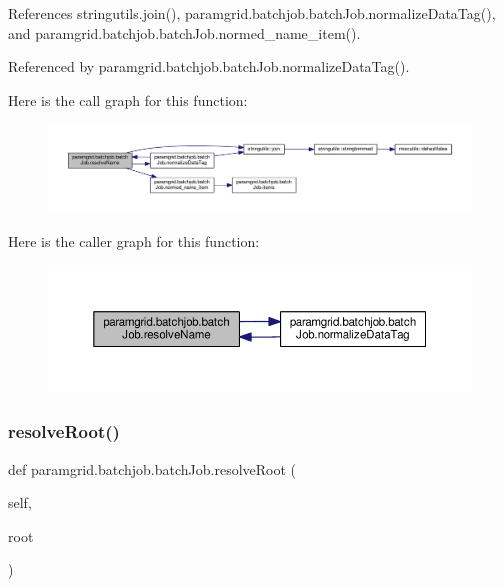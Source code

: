 References stringutils.\+join(), paramgrid.\+batchjob.\+batch\+Job.\+normalize\+Data\+Tag(), and paramgrid.\+batchjob.\+batch\+Job.\+normed\+\_\+name\+\_\+item().



Referenced by paramgrid.\+batchjob.\+batch\+Job.\+normalize\+Data\+Tag().

Here is the call graph for this function\+:
\nopagebreak
\begin{figure}[H]
\begin{center}
\leavevmode
\includegraphics[width=350pt]{classparamgrid_1_1batchjob_1_1batchJob_ac178cba753c0e34bf0402ed35db56f51_cgraph}
\end{center}
\end{figure}
Here is the caller graph for this function\+:
\nopagebreak
\begin{figure}[H]
\begin{center}
\leavevmode
\includegraphics[width=350pt]{classparamgrid_1_1batchjob_1_1batchJob_ac178cba753c0e34bf0402ed35db56f51_icgraph}
\end{center}
\end{figure}
\mbox{\label{classparamgrid_1_1batchjob_1_1batchJob_aa8a343f42f15d9546b5de3a46fbd53e1}} 
\subsubsection{\texorpdfstring{resolve\+Root()}{resolveRoot()}}
{\footnotesize\ttfamily def paramgrid.\+batchjob.\+batch\+Job.\+resolve\+Root (\begin{DoxyParamCaption}\item[{}]{self,  }\item[{}]{root }\end{DoxyParamCaption})}



